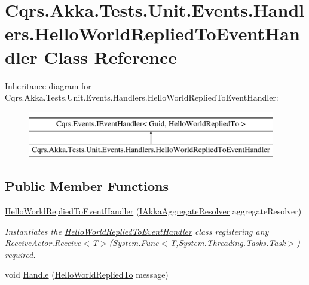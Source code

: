 \hypertarget{classCqrs_1_1Akka_1_1Tests_1_1Unit_1_1Events_1_1Handlers_1_1HelloWorldRepliedToEventHandler}{}\section{Cqrs.\+Akka.\+Tests.\+Unit.\+Events.\+Handlers.\+Hello\+World\+Replied\+To\+Event\+Handler Class Reference}
\label{classCqrs_1_1Akka_1_1Tests_1_1Unit_1_1Events_1_1Handlers_1_1HelloWorldRepliedToEventHandler}
Inheritance diagram for Cqrs.\+Akka.\+Tests.\+Unit.\+Events.\+Handlers.\+Hello\+World\+Replied\+To\+Event\+Handler\+:\begin{figure}[H]
\begin{center}
\leavevmode
\includegraphics[height=2.000000cm]{classCqrs_1_1Akka_1_1Tests_1_1Unit_1_1Events_1_1Handlers_1_1HelloWorldRepliedToEventHandler}
\end{center}
\end{figure}
\subsection*{Public Member Functions}
\begin{DoxyCompactItemize}
\item 
\hyperlink{classCqrs_1_1Akka_1_1Tests_1_1Unit_1_1Events_1_1Handlers_1_1HelloWorldRepliedToEventHandler_aa566f26a38bc21ed270a1854de47408d}{Hello\+World\+Replied\+To\+Event\+Handler} (\hyperlink{interfaceCqrs_1_1Akka_1_1Domain_1_1IAkkaAggregateResolver}{I\+Akka\+Aggregate\+Resolver} aggregate\+Resolver)
\begin{DoxyCompactList}\small\item\em Instantiates the \hyperlink{classCqrs_1_1Akka_1_1Tests_1_1Unit_1_1Events_1_1Handlers_1_1HelloWorldRepliedToEventHandler}{Hello\+World\+Replied\+To\+Event\+Handler} class registering any Receive\+Actor.\+Receive$<$\+T$>$(\+System.\+Func$<$\+T,\+System.\+Threading.\+Tasks.\+Task$>$) required. \end{DoxyCompactList}\item 
void \hyperlink{classCqrs_1_1Akka_1_1Tests_1_1Unit_1_1Events_1_1Handlers_1_1HelloWorldRepliedToEventHandler_a12509fd1219657eca78496775641f481}{Handle} (\hyperlink{classCqrs_1_1Akka_1_1Tests_1_1Unit_1_1Events_1_1HelloWorldRepliedTo}{Hello\+World\+Replied\+To} message)
\end{DoxyCompactItemize}
